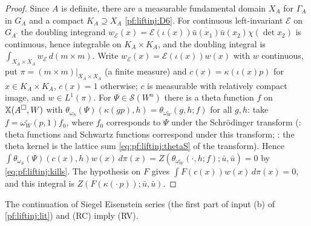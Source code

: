 \begin{proof}
Since $A$ is definite, there are a measurable fundamental domain $X_A$ for $\Gamma_A$ in $G_A$ and a compact $K_A\supseteq X_A$
\ref{pf:liftinj:D6}. For continuous left-invariant $\mathcal E$ on $G_{A^\square}$ the doubling integrand
$w_{\mathcal E}(x)=\mathcal E(\iota(x))\overline{\bar u(x_1)}\bar u(x_2)\chi(\det x_2)$ is continuous, hence integrable on $K_A\times K_A$, and the
doubling integral is $\int_{X_A\times X_A}w_{\mathcal E}\,d(m\times m)$. Write $w_{\mathcal E}(x)=\mathcal E(\iota(x))w(x)$ with $w$ continuous, put
$\pi=(m\times m)|_{X_A\times X_A}$ (a finite measure) and $c(x)=\kappa(\iota(x)p)$ for $x\in K_A\times K_A$, $c(x)=1$ otherwise; $c$ is measurable
with relatively compact image, and $w\in L^1(\pi)$. For $\Psi\in\mathcal S(W^n)$ there is a theta function $f$ on $\mathbb{X}(A^\square,W)$ with
$\theta_{\omega_S}(\Psi)(\kappa(gp),h)=\theta_{\omega_W^\square}(g,h;f)$ for all $g,h$: take $f=\omega^\square_W(p,1)f_0$, where $f_0$ corresponds to
$\Psi$ under the Schr\"odinger transform (: theta functions and Schwartz functions
correspond under this transform; : the theta kernel is the lattice sum
\eqref{eq:pf:liftinj:thetaS} of the transform). Hence $\int\theta_{\omega_S}(\Psi)(c(x),h)w(x)\,d\pi(x)=Z(\theta_{\omega_W^\square}(\cdot,h;f);\bar u,\bar u)=0$
by \eqref{eq:pf:liftinj:kills}. The hypothesis on $F$ gives $\int F(c(x))w(x)\,d\pi(x)=0$, and this integral is
$Z(F(\kappa(\cdot\,p));\bar u,\bar u)$.
\end{proof}

\begin{proposition}\label{pf:liftinj:resvan}
The continuation of Siegel Eisenstein series (the first part of input (b) of \cref{pf:liftinj:lit}) and (RC) imply (RV).
\end{proposition}

